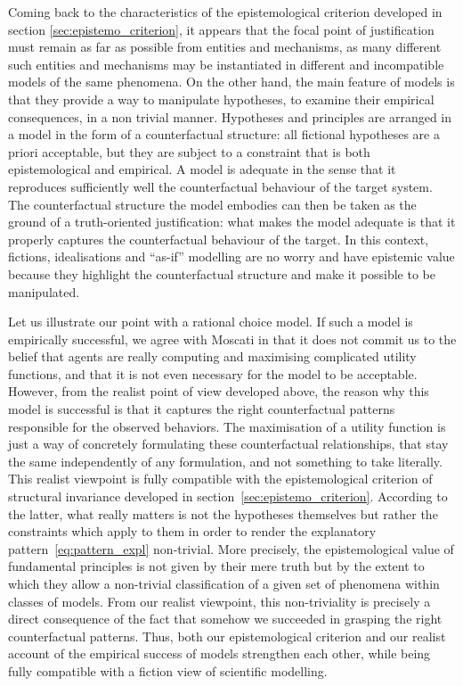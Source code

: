 \documentclass[a4paper,11pt]{article}
\theoremstyle{definition}
\begin{document}
Coming back to the characteristics of the epistemological criterion developed in section \ref{sec:epistemo_criterion}, it appears that the focal point of justification must remain as far as possible from entities and mechanisms, as many different such entities and mechanisms may be instantiated in different and incompatible models of the same phenomena. On the other hand, the main feature of models is that they provide a way to manipulate hypotheses, to examine their empirical consequences, in a non trivial manner. Hypotheses and principles are arranged in a model in the form of a counterfactual structure: all fictional hypotheses are a priori acceptable, but they are subject to a constraint that is both epistemological and empirical. A model is adequate in the sense that it reproduces sufficiently well the counterfactual behaviour of the target system. The counterfactual structure the model embodies can then be taken as the ground of a truth-oriented justification: what makes the model adequate is that it properly captures the counterfactual behaviour of the target. In this context, fictions, idealisations and ``as-if'' modelling are no worry and have epistemic value because they highlight the counterfactual structure and make it possible to be manipulated.

Let us illustrate our point with a rational choice model. If such a model is empirically successful, we agree with Moscati in that it does not commit us to the belief that agents are really computing and maximising complicated utility functions, and that it is not even necessary for the model to be acceptable. However, from the realist point of view developed above, the reason why this model is successful is that it captures the right counterfactual patterns responsible for the observed behaviors. The maximisation of a utility function is just a way of concretely formulating these counterfactual relationships, that stay the same independently of any formulation, and not something to take literally. This realist viewpoint is fully compatible with the epistemological criterion of structural invariance developed in section~\ref{sec:epistemo_criterion}. According to the latter, what really matters is not the hypotheses themselves but rather the constraints which apply to them in order to render the explanatory pattern~\eqref{eq:pattern_expl} non-trivial. More precisely, the epistemological value of fundamental principles is not given by their mere truth but by the extent to which they allow a non-trivial classification of a given set of phenomena within classes of models. From our realist viewpoint, this non-triviality is precisely a direct consequence of the fact that somehow we succeeded in grasping the right counterfactual patterns. Thus, both our epistemological criterion and our realist account of the empirical success of models strengthen each other, while being fully compatible with a fiction view of scientific modelling. 
\end{document}
